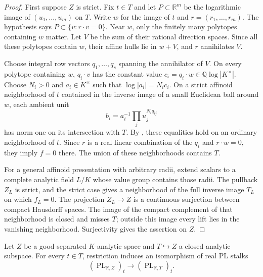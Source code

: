 \documentclass[11pt,a4paper]{amsart}
\begin{document}
\begin{proof}
First suppose $Z$ is strict. Fix $t\in T$ and let $P\subset\mathbb R^m$ be the logarithmic image of $(u_1,\ldots,u_m)$ on $T$. Write $w$ for the image of $t$ and $r=(r_1,\ldots,r_m)$. The hypothesis says $P\subset\{v:r\cdot v=0\}$. Near $w$, only the finitely many polytopes containing $w$ matter. Let $V$ be the sum of their rational direction spaces. Since all these polytopes contain $w$, their affine hulls lie in $w+V$, and $r$ annihilates $V$.

Choose integral row vectors $q_1,\ldots,q_s$ spanning the annihilator of $V$. On every polytope containing $w$, $q_i\cdot v$ has the constant value $c_i=q_i\cdot w\in\mathbb Q\log|K^\times|$. Choose $N_i>0$ and $a_i\in K^\times$ such that $\log|a_i|=N_ic_i$. On a strict affinoid neighborhood of $t$ contained in the inverse image of a small Euclidean ball around $w$, each ambient unit
\[
 b_i=a_i^{-1}\prod_j u_j^{N_iq_{ij}}
\]
has norm one on its intersection with $T$. By , these equalities hold on an ordinary neighborhood of $t$. Since $r$ is a real linear combination of the $q_i$ and $r\cdot w=0$, they imply $f=0$ there. The union of these neighborhoods contains $T$.

For a general affinoid presentation with arbitrary radii, extend scalars to a complete analytic field $L/K$ whose value group contains those radii. The pullback $Z_L$ is strict, and the strict case gives a neighborhood of the full inverse image $T_L$ on which $f_L=0$. The projection $Z_L\to Z$ is a continuous surjection between compact Hausdorff spaces. The image of the compact complement of that neighborhood is closed and misses $T$; outside this image every lift lies in the vanishing neighborhood. Surjectivity gives the assertion on $Z$.
\end{proof}

\begin{proposition}\label{prop:closed-pl-germs}
Let $Z$ be a good separated $K$-analytic space and $T\hookrightarrow Z$ a closed analytic subspace. For every $t\in T$, restriction induces an isomorphism of real PL stalks
\[
 (\operatorname{PL}_{\mathbb R,Z})_t\longrightarrow(\operatorname{PL}_{\mathbb R,T})_t.
\]
\end{proposition}
\end{document}
